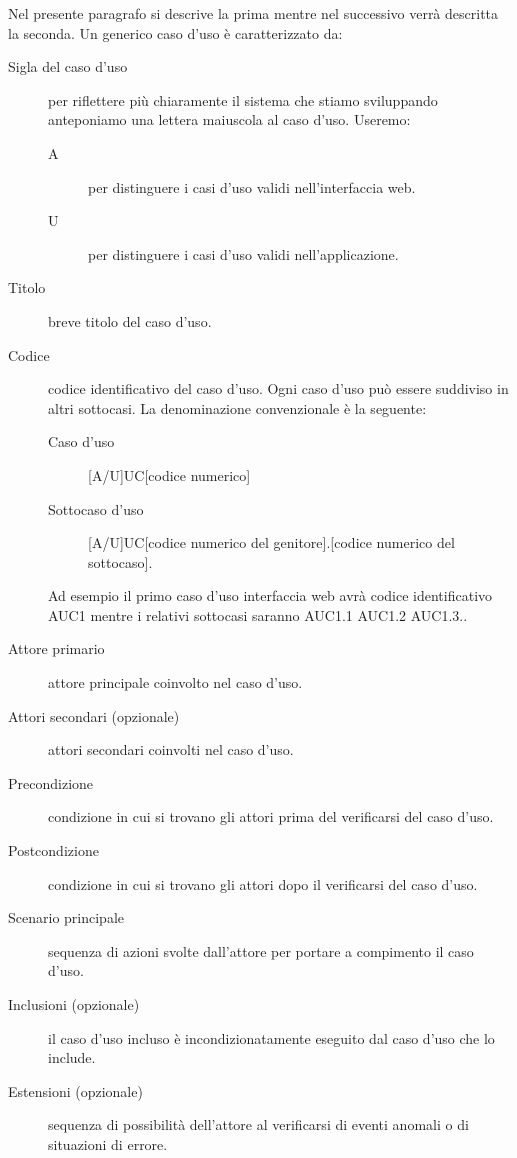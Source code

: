\documentclass[../norme-di-progetto.tex]{subfiles}
\begin{document}
Nel presente paragrafo si descrive la prima mentre nel successivo verrà descritta la seconda.
Un generico caso d'uso è caratterizzato da:
\begin{description}
  \item [Sigla del caso d'uso] per riflettere più chiaramente il sistema che stiamo sviluppando anteponiamo una lettera maiuscola al caso d'uso.
        Useremo:
        \begin{description}
          \item [A] per distinguere i casi d'uso validi nell'interfaccia web.
          \item [U] per distinguere i casi d'uso validi nell'applicazione.
        \end{description}
  \item [Titolo] breve titolo del caso d'uso.
  \item [Codice] codice identificativo del caso d'uso. Ogni caso d'uso può essere suddiviso in altri sottocasi. La denominazione convenzionale è la seguente:
        \begin{description}
          \item [Caso d'uso] [A/U]UC[codice numerico]
          \item [Sottocaso d'uso] [A/U]UC[codice numerico del genitore].[codice numerico del sottocaso].
        \end{description}
        Ad esempio il primo caso d'uso interfaccia web avrà codice identificativo AUC1 mentre i relativi sottocasi saranno AUC1.1 AUC1.2 AUC1.3..
  \item [Attore primario] attore principale coinvolto nel caso d'uso.
  \item [Attori secondari (opzionale)] attori secondari coinvolti nel caso d'uso.
  \item [Precondizione] condizione in cui si trovano gli attori prima del verificarsi del caso d'uso.
  \item [Postcondizione] condizione in cui si trovano gli attori dopo il verificarsi del caso d'uso.
  \item [Scenario principale] sequenza di azioni svolte dall'attore per portare a compimento il caso d'uso.
  \item [Inclusioni (opzionale)] il caso d'uso incluso è incondizionatamente eseguito dal caso d'uso che lo include.
  \item [Estensioni (opzionale)] sequenza di possibilità dell'attore al verificarsi di eventi anomali o di situazioni di errore.
\end{description}
\end{document}
